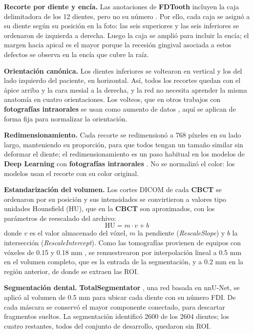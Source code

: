 \documentclass[runningheads]{llncs}
\newcommand{\sol}[1]{\textcolor{solucion}{\textbf{#1}}}
\newcommand{\dat}[1]{\textcolor{dataset}{\textbf{#1}}}
\newcommand{\sol}[1]{#1}
\newcommand{\dat}[1]{#1}
\begin{document}
\textbf{Recorte por diente y encía.} Las anotaciones de \dat{FDTooth}
incluyen la caja delimitadora de los 12 dientes, pero no su número
\cite{liu2025fdtooth}. Por ello, cada caja se asignó a su diente según su
posición en la foto: las seis superiores y las seis inferiores se
ordenaron de izquierda a derecha. Luego la caja se amplió para incluir
la encía; el margen hacia apical es el mayor porque la recesión gingival
asociada a estos defectos \cite{liu2025fdtooth} se observa en la encía
que cubre la raíz.

\textbf{Orientación canónica.} Los dientes inferiores se voltearon en
vertical y los del lado izquierdo del paciente, en horizontal. Así, todos
los recortes quedan con el ápice arriba y la cara mesial a la derecha, y
la red no necesita aprender la misma anatomía en cuatro orientaciones.
Los volteos, que en otros trabajos con \dat{fotografías intraorales} se
usan como aumento de datos \cite{mao2025photographs}, aquí se aplican de
forma fija para normalizar la orientación.

\textbf{Redimensionamiento.} Cada recorte se redimensionó a 768 píxeles
en su lado largo, manteniendo su proporción, para que todos tengan un
tamaño similar sin deformar el diente; el redimensionamiento es un paso
habitual en los modelos de \sol{Deep Learning} con \dat{fotografías
intraorales} \cite{mao2025photographs}. No se normalizó el color: los
modelos usan el recorte con su color original.

\textbf{Estandarización del volumen.} Los cortes DICOM de cada
\dat{CBCT} se ordenaron por su posición y sus intensidades se convirtieron
a valores tipo unidades Hounsfield (HU), que en la \dat{CBCT} son
aproximados, con los parámetros de reescalado del archivo:
\begin{equation}
\mathrm{HU} = m \cdot v + b
\label{eq:hu}
\end{equation}
donde $v$ es el valor almacenado del vóxel, $m$ la pendiente
(\textit{RescaleSlope}) y $b$ la intersección (\textit{RescaleIntercept}).
Como las tomografías provienen de equipos con vóxeles de 0.15 y 0.18 mm
\cite{liu2025fdtooth}, se remuestrearon por interpolación lineal a 0.5 mm
en el volumen completo, que es la entrada de la segmentación, y a 0.2 mm
en la región anterior, de donde se extraen las ROI.

\textbf{Segmentación dental.} \sol{TotalSegmentator}
\cite{wasserthal2023totalsegmentator}, una red basada en nnU-Net, se
aplicó al volumen de 0.5 mm para ubicar cada diente con su número FDI.
De cada máscara se conservó el mayor componente conectado, para descartar
fragmentos sueltos. La segmentación identificó 2600 de los 2604 dientes;
los cuatro restantes, todos del conjunto de desarrollo, quedaron sin ROI.
\end{document}
